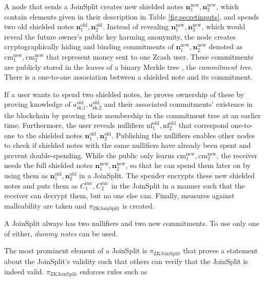 \documentclass{article}
\begin{document}
A node that sends a JoinSplit creates new shielded notes $\boldsymbol{n}^\text{new}_1,\boldsymbol{n}^\text{new}_2$, which contain elements given in their description in Table \ref{fig:secretinputs}, and spends two old shielded notes $\boldsymbol{n}^\text{old}_1,\boldsymbol{n}^\text{old}_2$.
Instead of revealing $\boldsymbol{n}^\text{new}_1,\boldsymbol{n}^\text{new}_2$, which would reveal the future owner's public key harming anonymity, the node creates cryptographically hiding and binding commitments of $\boldsymbol{n}^\text{new}_1,\boldsymbol{n}^\text{new}_2$ denoted as $\text{cm}_1^\text{new}, {\text{cm}_2^\text{new}}$ that represent money sent to one Zcash user.
These commitments are publicly stored in the leaves of a binary Merkle tree \cite{merkle:tree}, the \textit{commitment tree}.
There is a one-to-one association between a shielded note and its commitment.

If a user wants to spend two shielded notes, he proves ownership of these by proving knowledge of $a_\text{sk,$1$}^\text{old}, a_\text{sk,$2$}^\text{old}$ and their associated commitments' existence in the blockchain by proving their membership in the commitment tree at an earlier time.
Furthermore, the user reveals nullifiers $\text{nf}_1^\text{old}, {\text{nf}_2^\text{old}}$ that correspond one-to-one to the shielded notes $\boldsymbol{n}^\text{old}_1,\boldsymbol{n}^\text{old}_2$.
Publishing the nullifiers enables other nodes to check if shielded notes with the same nullifiers have already been spent and prevent double-spending.
While the public only learns $\text{cm}_1^\text{new}, {\text{cm}_2^\text{new}}$, the receiver needs the full shielded notes $\boldsymbol{n}^\text{new}_1,\boldsymbol{n}^\text{new}_2$, so that he can spend them later on by using them as $\boldsymbol{n}^\text{old}_1,\boldsymbol{n}^\text{old}_2$ in a JoinSplit.
The spender encrypts these new shielded notes and puts them as $C_1^\text{enc}, C_2^\text{enc}$ in the JoinSplit in a manner such that the receiver can decrypt them, but no one else can.
Finally, measures against malleability are taken and $\pi_\text{ZKJoinSplit}$ is created.

A JoinSplit always has two nullifiers and two new commitments.
To use only one of either, \textit{dummy notes} can be used.

The most prominent element of a JoinSplit is $\pi_\text{ZKJoinSplit}$ that proves a statement about the JoinSplit's validity such that others can verify that the JoinSplit is indeed valid.
$\pi_\text{ZKJoinSplit}$ enforces rules such as
\end{document}
